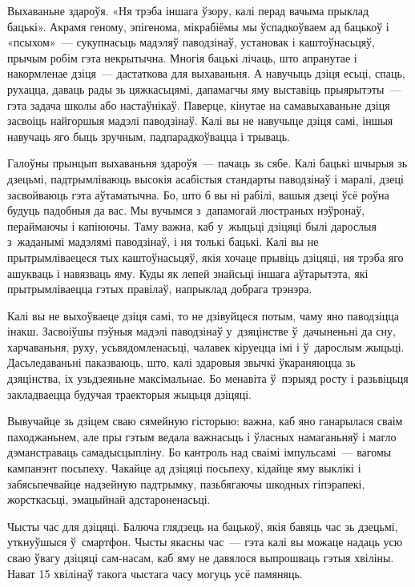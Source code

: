 Выхаваньне здароўя. «Ня трэба іншага ўзору, калі перад вачыма прыклад бацькі». Акрамя геному, эпігенома, мікрабіёмы мы ўспадкоўваем ад бацькоў і «псыхом»~--- сукупнасьць мадэляў паводзінаў, установак і каштоўнасьцяў, прычым робім гэта некрытычна. Многія бацькі лічаць, што апранутае і накормленае дзіця~--- дастаткова для выхаваньня. А навучыць дзіця есьці, спаць, рухацца, даваць рады зь цяжкасьцямі, дапамагчы яму выставіць прыярытэты~--- гэта задача школы або настаўнікаў. Паверце, кінутае на самавыхаваньне дзіця засвоіць найгоршыя мадэлі паводзінаў. Калі вы не навучыце дзіця самі, іншыя навучаць яго быць зручным, падпарадкоўвацца і трываць.

Галоўны прынцып выхаваньня здароўя~--- пачаць зь сябе. Калі бацькі шчырыя зь дзецьмі, падтрымліваюць высокія асабістыя стандарты паводзінаў і маралі, дзеці засвойваюць гэта аўтаматычна. Бо, што б вы ні рабілі, вашыя дзеці ўсё роўна будуць падобныя да вас. Мы вучымся з~дапамогай люстраных нэўронаў, пераймаючы і капіюючы. Таму важна, каб у~жыцьці дзіцяці былі дарослыя з~жаданымі мадэлямі паводзінаў, і ня толькі бацькі. Калі вы не прытрымліваецеся тых каштоўнасьцяў, якія хочаце прывіць дзіцяці, ня трэба яго ашукваць і навязваць яму. Куды як лепей знайсьці іншага аўтарытэта, які прытрымліваецца гэтых правілаў, напрыклад добрага трэнэра.

Калі вы не выхоўваеце дзіця самі, то не дзівуйцеся потым, чаму яно паводзіцца інакш. Засвоіўшы пэўныя мадэлі паводзінаў у~дзяцінстве ў~дачыненьні да сну, харчаваньня, руху, усьвядомленасьці, чалавек кіруецца імі і ў~дарослым жыцьці. Дасьледаваньні паказваюць, што, калі здаровыя звычкі ўкараняюцца зь дзяцінства, іх узьдзеяньне максімальнае. Бо менавіта ў~пэрыяд росту і разьвіцьця закладваецца будучая траекторыя жыцьця дзіцяці.

Вывучайце зь дзіцем сваю сямейную гісторыю: важна, каб яно ганарылася сваім паходжаньнем, але пры гэтым ведала важнасьць і ўласных намаганьняў і магло дэманстраваць самадысцыпліну. Бо кантроль над сваімі імпульсамі~--- вагомы кампанэнт посьпеху. Чакайце ад дзіцяці посьпеху, кідайце яму выклікі і забясьпечвайце надзейную падтрымку, пазьбягаючы шкодных гіпэрапекі, жорсткасьці, эмацыйнай адстароненасьці.

Чысты час для дзіцяці. Балюча глядзець на бацькоў, якія бавяць час зь дзецьмі, уткнуўшыся ў~смартфон. Чысты якасны час~--- гэта калі вы можаце надаць усю сваю ўвагу дзіцяці сам-насам, каб яму не давялося выпрошваць гэтыя хвіліны. Нават 15 хвілінаў такога чыстага часу могуць усё памяняць.

